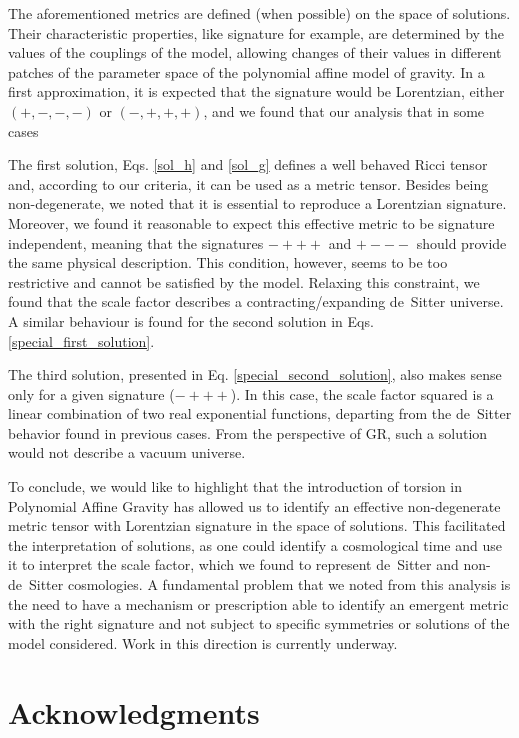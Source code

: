 \documentclass[epj]{svjour}
\begin{document}
The aforementioned metrics are defined (when possible) on the space of solutions. Their characteristic properties, like signature for example, are determined by the values of the couplings of the model, allowing changes of their values in different patches of the parameter space of the polynomial affine model of gravity. In a first approximation, it is expected that the signature would be Lorentzian, either \((+,-,-,-)\) or \((-,+,+,+)\), and we found that our analysis that in some cases 

The first solution, Eqs. \eqref{sol_h} and \eqref{sol_g} defines a well behaved Ricci tensor and, according to our criteria, it can be used as a metric tensor. Besides being non-degenerate, we noted that it is essential to reproduce a Lorentzian signature. Moreover, we found it reasonable to expect this effective metric to be signature independent, meaning that the signatures $ - + + +$ and $+ - - -$ should provide the same physical description. This condition, however, seems to be too restrictive and cannot be satisfied by the model. Relaxing this constraint, we found that the scale factor describes a contracting/expanding de~Sitter universe. A similar behaviour is found for the second solution in Eqs. \eqref{special_first_solution}.

The third solution, presented in Eq. \eqref{special_second_solution}, also makes sense only for a given signature ($ - + + +$). In this case, the scale factor squared is a linear combination of two real exponential functions, departing from the de~Sitter behavior found in previous cases. From the perspective of GR, such a solution would not describe a vacuum universe. 

To conclude, we would like to highlight that  the introduction of torsion in Polynomial Affine Gravity has allowed us to identify an effective non-degenerate metric tensor with Lorentzian signature in the space of solutions. This facilitated the interpretation of solutions, as one could identify a cosmological time and use it to interpret the scale factor, which we found to represent de~Sitter and non-de~Sitter cosmologies. A fundamental problem that we noted from this analysis is the need to have a mechanism or prescription able to identify an emergent metric with the right signature and not subject to specific symmetries or solutions of the model considered. Work in this direction is currently underway. 



\section{Acknowledgments}
\end{document}
